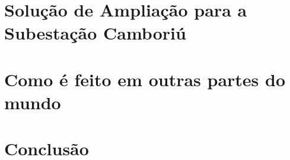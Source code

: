 \chapter{Solução de Ampliação para a Subestação Camboriú}
\label{chap:solAmp}
\textcolor{red}{\lipsum}

\chapter{Como é feito em outras partes do mundo}
\label{chap:asbuiltAbroad}
\textcolor{red}{\lipsum}

\chapter*[Conclusão]{Conclusão}
\textcolor{red}{\lipsum}
